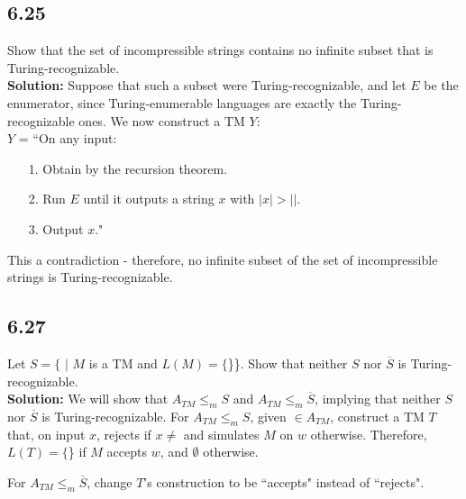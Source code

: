 \subsection*{6.25} Show that the set of incompressible strings contains no infinite subset that is Turing-recognizable.
\\
\textbf{Solution:} Suppose that such a subset were Turing-recognizable, and let $E$ be the enumerator, since Turing-enumerable languages are exactly the Turing-recognizable ones. We now construct a TM $Y$:
\\
$Y$ = ``On any input:
\begin{enumerate}
\itemsep0em
\item[1.]Obtain  by the recursion theorem.
\item[2.]Run $E$ until it outputs a string $x$ with $|x| > |$$|$.
\item[3.]Output $x$."
\end{enumerate}
This a contradiction - therefore, no infinite subset of the set of incompressible strings is Turing-recognizable.

\subsection*{6.27} Let $S = \{$ $|$ $M$ is a TM and $L(M) = \{$\}\}. Show that neither $S$ nor $\overline{S}$ is Turing-recognizable.
\\
\textbf{Solution:} We will show that $A_{TM} \le_m S$ and $A_{TM} \le_m \overline{S}$, implying that neither $S$ nor $\overline{S}$ is Turing-recognizable. For $A_{TM} \le_m S$, given  $\in A_{TM}$, construct a TM $T$ that, on input $x$, rejects if $x \ne$  and simulates $M$ on $w$ otherwise. Therefore, $L(T) = \{$\} if $M$ accepts $w$, and $\emptyset$ otherwise.

\par For $A_{TM} \le_m \overline{S}$, change $T$'s construction to be ``accepts" instead of ``rejects". 
